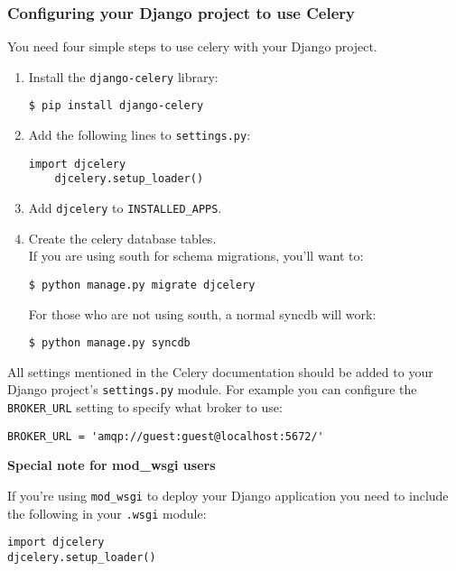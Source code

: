 \documentclass[9pt,a4paper]{article}
\begin{document}
\begin{CJK*}{GBK}{kai}
\subsubsection{Configuring your Django project to use Celery}

You need four simple steps to use celery with your Django project.

\begin{enumerate}
\item Install the \verb"django-celery" library:
    \begin{Verbatim}[frame=single]
    $ pip install django-celery
    \end{Verbatim}
\item Add the following lines to \verb"settings.py":
    \begin{Verbatim}[frame=single]
    import djcelery
    djcelery.setup_loader()
    \end{Verbatim}
\item Add \verb"djcelery" to \verb"INSTALLED_APPS".
\item Create the celery database tables.\\
    If you are using south for schema migrations, you\textquoteright ll want to:
    \begin{Verbatim}[frame=single]
    $ python manage.py migrate djcelery
    \end{Verbatim}
    For those who are not using south, a normal syncdb will work:
    \begin{Verbatim}[frame=single]
    $ python manage.py syncdb
    \end{Verbatim}
\end{enumerate}

All settings mentioned in the Celery documentation should be added to your Django project\textquoteright s \verb"settings.py" module. For example you can configure the \verb"BROKER_URL" setting to specify what broker to use:

\begin{Verbatim}[frame=single]
BROKER_URL = 'amqp://guest:guest@localhost:5672/'
\end{Verbatim}

\textbf{Special note for mod\_wsgi users}

If you’re using \verb"mod_wsgi" to deploy your Django application you need to include the following in your \verb".wsgi" module:

\begin{Verbatim}[frame=single]
import djcelery
djcelery.setup_loader()
\end{Verbatim}


\end{CJK*}
\end{document}
